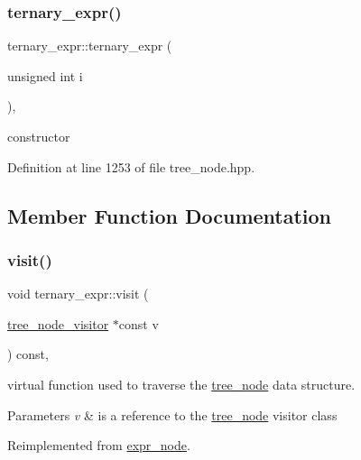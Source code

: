 \subsubsection{\texorpdfstring{ternary\+\_\+expr()}{ternary\_expr()}}
{\footnotesize\ttfamily ternary\+\_\+expr\+::ternary\+\_\+expr (\begin{DoxyParamCaption}\item[{unsigned int}]{i }\end{DoxyParamCaption})\hspace{0.3cm}{\ttfamily [inline]}, {\ttfamily [explicit]}}



constructor 



Definition at line 1253 of file tree\+\_\+node.\+hpp.



\subsection{Member Function Documentation}
\mbox{\label{structternary__expr_a3bb8b37b29b4cb797c4872c773184f5b}} 
\subsubsection{\texorpdfstring{visit()}{visit()}}
{\footnotesize\ttfamily void ternary\+\_\+expr\+::visit (\begin{DoxyParamCaption}\item[{\hyperlink{classtree__node__visitor}{tree\+\_\+node\+\_\+visitor} $\ast$const}]{v }\end{DoxyParamCaption}) const\hspace{0.3cm}{\ttfamily [override]}, {\ttfamily [virtual]}}



virtual function used to traverse the \hyperlink{classtree__node}{tree\+\_\+node} data structure. 


\begin{DoxyParams}{Parameters}
{\em v} & is a reference to the \hyperlink{classtree__node}{tree\+\_\+node} visitor class \\
\hline
\end{DoxyParams}


Reimplemented from \hyperlink{structexpr__node_aac767878f13ca07371dde2c3938ef38a}{expr\+\_\+node}.



